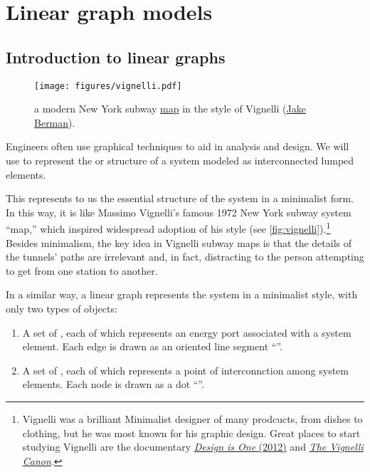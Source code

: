 \documentclass[dynamic_systems.tex]{subfiles}
\begin{document}
\chapter{Linear graph models}
\tags{}
\label{ch:linear_graph_models}

\section{Introduction to linear graphs}
\tags{}

\begin{figure}[!b]
\centering
\texttt{[image: figures/vignelli.pdf]}
\caption{a modern New York subway \href{https://en.wikipedia.org/wiki/File:NYC_subway-4D.svg}{map} in the style of Vignelli (\href{maps.complutense.org}{Jake Berman}).}
\label{fig:vignelli}
\end{figure}

Engineers often use graphical techniques to aid in analysis and design.
We will use  to represent the  or structure of a system modeled as interconnected lumped elements.
\tags{}

This represents to us the essential structure of the system in a minimalist form.
In this way, it is like Massimo Vignelli's famous 1972 New York subway system ``map,'' which inspired widespread adoption of his style (see \autoref{fig:vignelli}).\footnote{Vignelli was a brilliant Minimalist designer of many prodcucts, from dishes to clothing, but he was most known for his graphic design. Great places to start studying Vignelli are the documentary \href{http://www.imdb.com/title/tt2610862/}{\emph{Design is One} (2012)} and \href{http://www.vignelli.com/canon.pdf}{\emph{The Vignelli Canon}}.}
Besides minimalism, the key idea in Vignelli subway maps is that the details of the tunnels' paths are irrelevant and, in fact, distracting to the person attempting to get from one station to another.
\tags{}

In a similar way, a linear graph represents the system in a minimalist style, with only two types of objects:
\begin{enumerate}
	\item A set of , each of which represents an energy port associated with a system element.
	Each edge is drawn as an oriented line segment ``''.
	\item A set of , each of which represents a point of interconnction among system elements.
	Each node is drawn as a dot ``''.
\end{enumerate}
\end{document}
